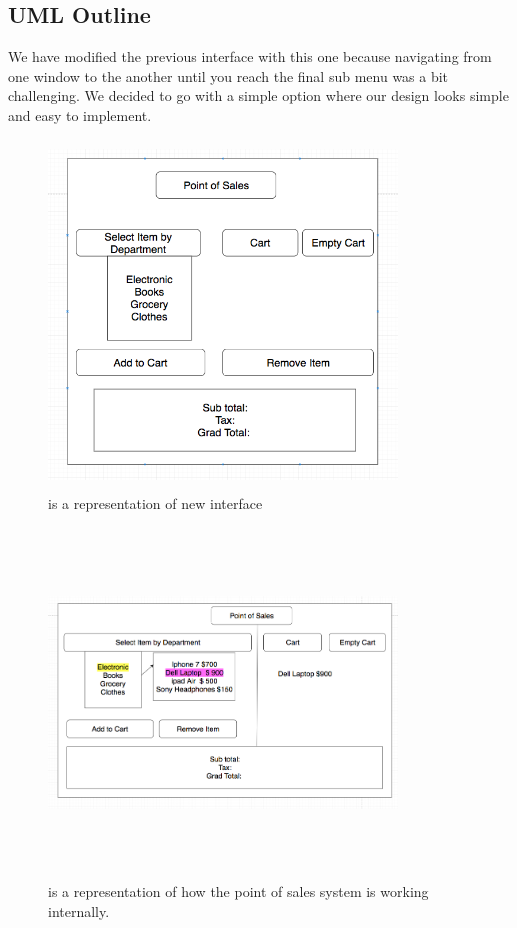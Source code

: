 \documentclass[10pt,conference,onecolumn,compsoc]{IEEEtran}
\begin{document}
\subsection{UML Outline}
We have modified the previous interface with this one because navigating from one window to the another until you reach the final sub menu was a bit challenging. We decided to go with a simple option where our design looks simple and easy to implement.

\begin{figure}[H]
\includegraphics[height=350px, width=350px]{main}
\caption{is a representation of new interface}
\label{newmain}
\end{figure}

\begin{figure}[H]
\includegraphics[height=350px, width=350px]{submenu}
\caption{ is a representation of how the point of sales system is working internally.}
\label{newmain}
\end{figure}
\end{document}
